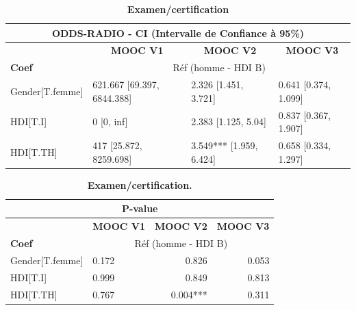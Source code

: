 \documentclass[12pt, a4paper, titlepage, table]{article}
\begin{document}
\begin{table}[H]
	\centering
	\fontsize{12}{20}\selectfont
	\begin{tabular}{|l|l|l|l|}
		\hline
		\multicolumn{4}{|c|}{\textbf{ODDS-RADIO - CI (Intervalle de Confiance à 95\%)}}\\
		\hline
		\multicolumn{1}{|c|}{\textbf{}}&
		\multicolumn{1}{c|}{\textbf{MOOC V1}}&
		\multicolumn{1}{c|}{\textbf{MOOC V2}}&
		\multicolumn{1}{c|}{\textbf{MOOC V3}}\\
		\hline
		\textbf{Coef}&
		\multicolumn{3}{c|}{Réf (homme - HDI B)}\\
		\hline
		Gender[T.femme]&621.667 [69.397, 6844.388]&  2.326 [1.451, 3.721]& 0.641 [0.374, 1.099]\\
		HDI[T.I]&		0 [0, inf]&	2.383 [1.125, 5.04]& 0.837 [0.367, 1.907]\\ 
		HDI[T.TH]&		417 [25.872, 8259.698]&	3.549*** [1.959, 6.424]&  0.658 [0.334, 1.297]\\
		\hline
	\end{tabular}
	\caption{\textbf{Examen/certification}}
\end{table}


\begin{table}[H]
	\centering
	\fontsize{12}{20}\selectfont
	\begin{tabular}{|l|l|r|r|}
		\hline
		\multicolumn{4}{|c|}{\textbf{P-value}}\\
		\hline
		\multicolumn{1}{|c|}{\textbf{}}&
		\multicolumn{1}{c|}{\textbf{MOOC V1}}&
		\multicolumn{1}{c|}{\textbf{MOOC V2}}&
		\multicolumn{1}{c|}{\textbf{MOOC V3}}\\
		\hline
		\textbf{Coef}&
		\multicolumn{3}{c|}{Réf (homme - HDI B)}\\
		\hline
		Gender[T.femme]&	0.172&	0.826&	0.053\\
		HDI[T.I]&		0.999&	0.849&	0.813\\
		HDI[T.TH]&		0.767&	0.004***&	0.311\\
		\hline
	\end{tabular}
	\caption{\textbf{Examen/certification.}}
\end{table}
\end{document}
